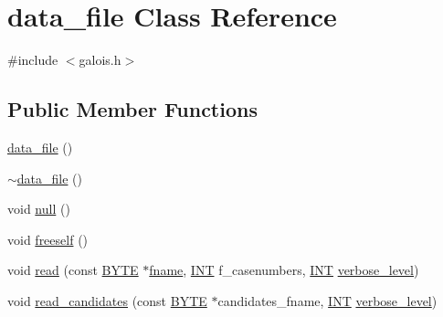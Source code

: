 \hypertarget{classdata__file}{}\section{data\+\_\+file Class Reference}
\label{classdata__file}


{\ttfamily \#include $<$galois.\+h$>$}

\subsection*{Public Member Functions}
\begin{DoxyCompactItemize}
\item 
\mbox{\hyperlink{classdata__file_a5104475f879c0e5fdcc35f906cf77db0}{data\+\_\+file}} ()
\item 
\mbox{\hyperlink{classdata__file_aa22160224049787c9f96f56fbbbbe010}{$\sim$data\+\_\+file}} ()
\item 
void \mbox{\hyperlink{classdata__file_a79d79d896f0392c516daf9d409f4aae9}{null}} ()
\item 
void \mbox{\hyperlink{classdata__file_a01eb99b854156722d99419f407f1374d}{freeself}} ()
\item 
void \mbox{\hyperlink{classdata__file_a34c1f9447c977e2e98958930853afaf0}{read}} (const \mbox{\hyperlink{galois_8h_ab6cc7b4aeb6ea31aba2b3fbfc83ff5e6}{B\+Y\+TE}} $\ast$\mbox{\hyperlink{classdata__file_aa3ba8957bff97622ed7f9c5e6a93ebb1}{fname}}, \mbox{\hyperlink{galois_8h_a09fddde158a3a20bd2dcadb609de11dc}{I\+NT}} f\+\_\+casenumbers, \mbox{\hyperlink{galois_8h_a09fddde158a3a20bd2dcadb609de11dc}{I\+NT}} \mbox{\hyperlink{simeon_8_c_a818073fbcc2f439e7c56952f67386122}{verbose\+\_\+level}})
\item 
void \mbox{\hyperlink{classdata__file_acf077d7faac5b228bd88ce8dae0dda3b}{read\+\_\+candidates}} (const \mbox{\hyperlink{galois_8h_ab6cc7b4aeb6ea31aba2b3fbfc83ff5e6}{B\+Y\+TE}} $\ast$candidates\+\_\+fname, \mbox{\hyperlink{galois_8h_a09fddde158a3a20bd2dcadb609de11dc}{I\+NT}} \mbox{\hyperlink{simeon_8_c_a818073fbcc2f439e7c56952f67386122}{verbose\+\_\+level}})
\end{DoxyCompactItemize}
